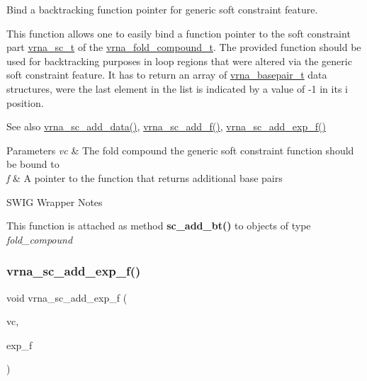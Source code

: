 Bind a backtracking function pointer for generic soft constraint feature. 

This function allows one to easily bind a function pointer to the soft constraint part \mbox{\hyperlink{group__soft__constraints_ga75401ce219ef8dbcceb672db82d434c6}{vrna\+\_\+sc\+\_\+t}} of the \mbox{\hyperlink{group__fold__compound_ga1b0cef17fd40466cef5968eaeeff6166}{vrna\+\_\+fold\+\_\+compound\+\_\+t}}. The provided function should be used for backtracking purposes in loop regions that were altered via the generic soft constraint feature. It has to return an array of \mbox{\hyperlink{group__data__structures_gac8c5669d3fb813cacf506489689305ce}{vrna\+\_\+basepair\+\_\+t}} data structures, were the last element in the list is indicated by a value of -\/1 in it\textquotesingle{}s i position.

\begin{DoxySeeAlso}{See also}
\mbox{\hyperlink{group__soft__constraints_ga15c6d52471ec97897e2bb7f964f5deb6}{vrna\+\_\+sc\+\_\+add\+\_\+data()}}, \mbox{\hyperlink{group__soft__constraints_ga8c7d907ec0125cd61c04e0908010a4e9}{vrna\+\_\+sc\+\_\+add\+\_\+f()}}, \mbox{\hyperlink{group__soft__constraints_ga87e382b5d0c9b7d9ce1b79c0473ff700}{vrna\+\_\+sc\+\_\+add\+\_\+exp\+\_\+f()}}
\end{DoxySeeAlso}

\begin{DoxyParams}{Parameters}
{\em vc} & The fold compound the generic soft constraint function should be bound to \\
\hline
{\em f} & A pointer to the function that returns additional base pairs\\
\hline
\end{DoxyParams}
\begin{DoxyRefDesc}{S\+W\+I\+G Wrapper Notes}
\item[\mbox{\hyperlink{wrappers__wrappers000041}{S\+W\+I\+G Wrapper Notes}}]This function is attached as method {\bfseries{sc\+\_\+add\+\_\+bt()}} to objects of type {\itshape fold\+\_\+compound} \end{DoxyRefDesc}
\mbox{\label{group__soft__constraints_ga87e382b5d0c9b7d9ce1b79c0473ff700}} 
\subsubsection{\texorpdfstring{vrna\_sc\_add\_exp\_f()}{vrna\_sc\_add\_exp\_f()}}
{\footnotesize\ttfamily void vrna\+\_\+sc\+\_\+add\+\_\+exp\+\_\+f (\begin{DoxyParamCaption}\item[{\mbox{\hyperlink{group__fold__compound_ga1b0cef17fd40466cef5968eaeeff6166}{vrna\+\_\+fold\+\_\+compound\+\_\+t}} $\ast$}]{vc,  }\item[{\mbox{\hyperlink{group__soft__constraints_ga4099978d410513edeeff8f3db13144c5}{vrna\+\_\+callback\+\_\+sc\+\_\+exp\+\_\+energy}} $\ast$}]{exp\+\_\+f }\end{DoxyParamCaption})}



